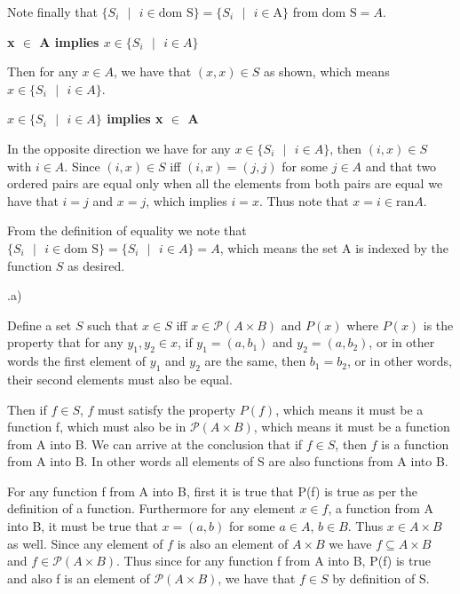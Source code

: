 \documentclass{article}
\begin{document}
Note finally that $\{S_i \text{ } | \text{ } i \in \text{dom S}\} = \{S_i \text{ } | \text{ } i \in \text{A}\}$ from $\text{dom S} = A$.

\medskip
\textbf{x $\in$ A implies $x \in \{S_i \text{ } | \text{ } i \in A\}$}
\medskip

Then for any $x \in A$, we have that $(x,x) \in S$ as shown, which means $x \in \{S_i \text{ } | \text{ } i \in A\}$. 

\medskip
\textbf{$x \in \{S_i \text{ } | \text{ } i \in A\}$ implies x $\in$ A}
\medskip

In the opposite direction we have for any $x \in \{S_i \text{ } | \text{ } i \in A\}$, then $(i,x) \in S$ with $i \in A$. Since $(i,x) \in S$ iff $(i,x) = (j,j)$ for some $j \in A$ and that two ordered pairs are equal only when all the elements from both pairs are equal we have that $i = j$ and $x = j$, which implies $i = x$. Thus note that $x = i \in \text{ran} A$. 

\medskip

From the definition of equality we note that $\{S_i \text{ } | \text{ } i \in \text{dom S}\} = \{S_i \text{ } | \text{ } i \in A\} = A$, which means the set A is indexed by the function $S$ as desired.

.a)

Define a set $S$ such that $x \in S$ iff $x \in \mathcal{P}(A \times B)$ and $P(x)$ where $P(x)$ is the property that for any $y_1,y_2 \in x$, if $y_1 = (a,b_1)$ and $y_2 = (a,b_2)$, or in other words the first element of $y_1$ and $y_2$ are the same, then $b_1 = b_2$, or in other words, their second elements must also be equal. 

\medskip

Then if $f \in S$, $f$ must satisfy the property $P(f)$, which means it must be a function f, which must also be in $\mathcal{P}(A \times B)$, which means it must be a function from A into B. We can arrive at the conclusion that if $f \in S$, then $f$ is a function from A into B. In other words all elements of S are also functions from A into B.

\medskip

For any function f from A into B, first it is true that P(f) is true as per the definition of a function. Furthermore for any element $x \in f$, a function from A into B, it must be true that $x = (a,b)$ for some $a \in A$, $b \in B$. Thus $x \in A \times B$ as well. Since any element of $f$ is also an element of $A \times B$ we have $f \subseteq A \times B$ and $f \in \mathcal{P}(A \times B)$. Thus since for any function f from A into B, P(f) is true and also f is an element of $\mathcal{P}(A \times B)$, we have that $f \in S$ by definition of S.
\end{document}
